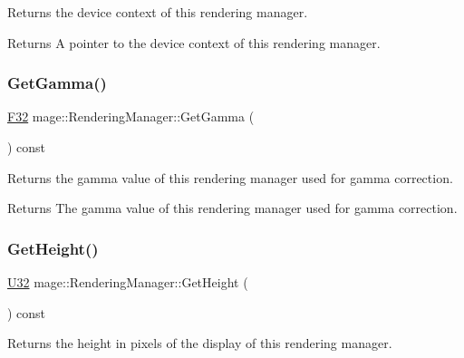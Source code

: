 Returns the device context of this rendering manager.

\begin{DoxyReturn}{Returns}
A pointer to the device context of this rendering manager. 
\end{DoxyReturn}
\hypertarget{classmage_1_1_rendering_manager_ad8608d1bf10ef4cf92bbdea4c2d8c1a3}{}\label{classmage_1_1_rendering_manager_ad8608d1bf10ef4cf92bbdea4c2d8c1a3} 
\subsubsection{\texorpdfstring{Get\+Gamma()}{GetGamma()}}
{\footnotesize\ttfamily \hyperlink{namespacemage_aa97e833b45f06d60a0a9c4fc22ae02c0}{F32} mage\+::\+Rendering\+Manager\+::\+Get\+Gamma (\begin{DoxyParamCaption}{ }\end{DoxyParamCaption}) const\hspace{0.3cm}{\ttfamily [noexcept]}}

Returns the gamma value of this rendering manager used for gamma correction.

\begin{DoxyReturn}{Returns}
The gamma value of this rendering manager used for gamma correction. 
\end{DoxyReturn}
\hypertarget{classmage_1_1_rendering_manager_a72867cf717dc889c463fd55346ec8500}{}\label{classmage_1_1_rendering_manager_a72867cf717dc889c463fd55346ec8500} 
\subsubsection{\texorpdfstring{Get\+Height()}{GetHeight()}}
{\footnotesize\ttfamily \hyperlink{namespacemage_a41c104c036fba3756a74e19f793eeaa1}{U32} mage\+::\+Rendering\+Manager\+::\+Get\+Height (\begin{DoxyParamCaption}{ }\end{DoxyParamCaption}) const\hspace{0.3cm}{\ttfamily [noexcept]}}

Returns the height in pixels of the display of this rendering manager.

